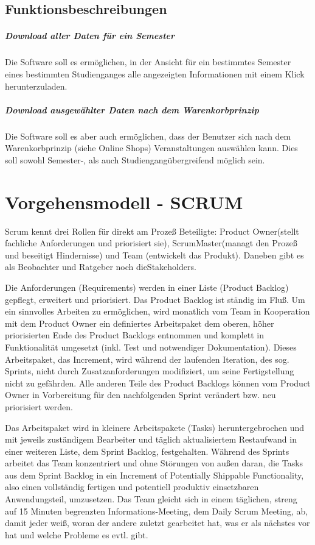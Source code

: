 \documentclass[11pt]{scrreprt}
\begin{document}
\section{Funktionsbeschreibungen}
\paragraph{Download aller Daten für ein Semester}
Die Software soll es ermöglichen, in der Ansicht für ein bestimmtes Semester eines bestimmten Studienganges alle angezeigten Informationen mit einem Klick herunterzuladen.

\paragraph{Download ausgewählter Daten nach dem Warenkorbprinzip}
Die Software soll es aber auch ermöglichen, dass der Benutzer sich nach dem Warenkorbprinzip (siehe Online Shops) Veranstaltungen auswählen kann. Dies soll sowohl Semester-, als auch Studiengangübergreifend möglich sein.

\chapter{Vorgehensmodell - SCRUM}
Scrum kennt drei Rollen für direkt am Prozeß Beteiligte: Product Owner(stellt fachliche Anforderungen und priorisiert sie), ScrumMaster(managt den Prozeß und beseitigt Hindernisse) und Team (entwickelt das Produkt). Daneben gibt es als Beobachter und Ratgeber noch dieStakeholders.

Die Anforderungen (Requirements) werden in einer Liste (Product Backlog) gepflegt, erweitert und priorisiert. Das Product Backlog ist ständig im Fluß. Um ein sinnvolles Arbeiten zu ermöglichen, wird monatlich vom Team in Kooperation mit dem Product Owner ein definiertes Arbeitspaket dem oberen, höher priorisierten Ende des Product Backlogs entnommen und komplett in Funktionalität umgesetzt (inkl. Test und notwendiger Dokumentation). Dieses Arbeitspaket, das Increment, wird während der laufenden Iteration, des sog. Sprints, nicht durch Zusatzanforderungen modifiziert, um seine Fertigstellung nicht zu gefährden. Alle anderen Teile des Product Backlogs können vom Product Owner in Vorbereitung für den nachfolgenden Sprint verändert bzw. neu priorisiert werden.

Das Arbeitspaket wird in kleinere Arbeitspakete (Tasks) heruntergebrochen und mit jeweils zuständigem Bearbeiter und täglich aktualisiertem Restaufwand in einer weiteren Liste, dem Sprint Backlog, festgehalten.  Während des Sprints arbeitet das Team konzentriert und ohne Störungen von außen daran, die Tasks aus dem Sprint Backlog in ein Increment of Potentially Shippable Functionality, also einen vollständig fertigen und potentiell produktiv einsetzbaren Anwendungsteil, umzusetzen. Das Team gleicht sich in einem täglichen, streng auf 15 Minuten begrenzten Informations-Meeting, dem Daily Scrum Meeting, ab, damit jeder weiß, woran der andere zuletzt gearbeitet hat, was er als nächstes vor hat und welche Probleme es evtl. gibt.
\end{document}
